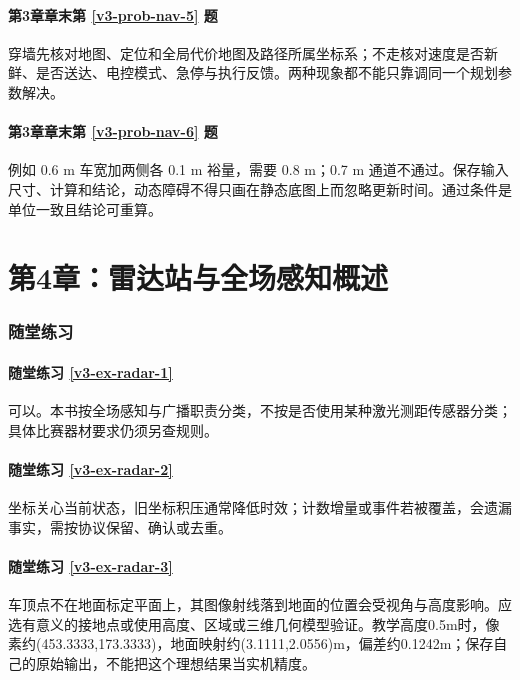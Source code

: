 \paragraph*{第3章章末第 \ref{v3-prob-nav-5} 题}
\begin{solution}
穿墙先核对地图、定位和全局代价地图及路径所属坐标系；不走核对速度是否新鲜、是否送达、电控模式、急停与执行反馈。两种现象都不能只靠调同一个规划参数解决。
\end{solution}

\paragraph*{第3章章末第 \ref{v3-prob-nav-6} 题}
\begin{solution}
例如 0.6 m 车宽加两侧各 0.1 m 裕量，需要 0.8 m；0.7 m 通道不通过。保存输入尺寸、计算和结论，动态障碍不得只画在静态底图上而忽略更新时间。通过条件是单位一致且结论可重算。
\end{solution}

\section*{第4章：雷达站与全场感知概述}
{}
\subsubsection*{随堂练习}
\paragraph*{随堂练习 \ref{v3-ex-radar-1}}
\begin{solution}
可以。本书按全场感知与广播职责分类，不按是否使用某种激光测距传感器分类；具体比赛器材要求仍须另查规则。
\end{solution}

\paragraph*{随堂练习 \ref{v3-ex-radar-2}}
\begin{solution}
坐标关心当前状态，旧坐标积压通常降低时效；计数增量或事件若被覆盖，会遗漏事实，需按协议保留、确认或去重。
\end{solution}

\paragraph*{随堂练习 \ref{v3-ex-radar-3}}
\begin{solution}
车顶点不在地面标定平面上，其图像射线落到地面的位置会受视角与高度影响。应选有意义的接地点或使用高度、区域或三维几何模型验证。教学高度0.5m时，像素约(453.3333,173.3333)，地面映射约(3.1111,2.0556)m，偏差约0.1242m；保存自己的原始输出，不能把这个理想结果当实机精度。
\end{solution}

